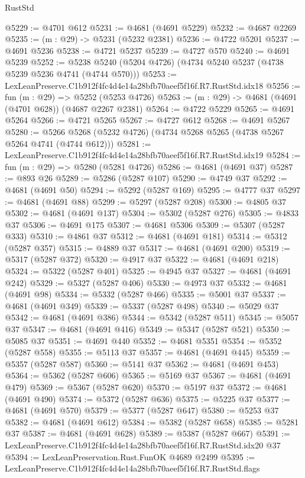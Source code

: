 \begin{lexlean}{RustStd}
\begin{coremodule}
@5229 := @4701 @612
@5231 := @4681 (@4691 @5229)
@5232 := @4687 @2269
@5235 := (m : @29) -> @5231 (@5232 @2381)
@5236 := @4722 @5201
@5237 := @4691 @5236
@5238 := @4721 @5237
@5239 := @4727 @570
@5240 := @4691 @5239
@5252 := @5238 @5240 (@5204 @4726) (@4734 @5240 @5237 (@4738 @5239 @5236 @4741 (@4744 @570)))
@5253 := LexLeanPreserve.C1b912f4fc4d4e14a28bfb70aeef5f16f.R7.RustStd.idx18
@5256 := fun (m : @29) => @5252 (@5253 @4726)
@5263 := (m : @29) -> @4681 (@4691 (@4701 @628)) (@4687 @2267 @2381)
@5264 := @4722 @5229
@5265 := @4691 @5264
@5266 := @4721 @5265
@5267 := @4727 @612
@5268 := @4691 @5267
@5280 := @5266 @5268 (@5232 @4726) (@4734 @5268 @5265 (@4738 @5267 @5264 @4741 (@4744 @612)))
@5281 := LexLeanPreserve.C1b912f4fc4d4e14a28bfb70aeef5f16f.R7.RustStd.idx19
@5284 := fun (m : @29) => @5280 (@5281 @4726)
@5286 := @4681 (@4691 @37)
@5287 := @893 @26
@5289 := @5286 (@5287 @107)
@5290 := @4749 @37
@5292 := @4681 (@4691 @50)
@5294 := @5292 (@5287 @169)
@5295 := @4777 @37
@5297 := @4681 (@4691 @88)
@5299 := @5297 (@5287 @208)
@5300 := @4805 @37
@5302 := @4681 (@4691 @137)
@5304 := @5302 (@5287 @276)
@5305 := @4833 @37
@5306 := @4691 @175
@5307 := @4681 @5306
@5309 := @5307 (@5287 @333)
@5310 := @4861 @37
@5312 := @4681 (@4691 @181)
@5314 := @5312 (@5287 @357)
@5315 := @4889 @37
@5317 := @4681 (@4691 @200)
@5319 := @5317 (@5287 @372)
@5320 := @4917 @37
@5322 := @4681 (@4691 @218)
@5324 := @5322 (@5287 @401)
@5325 := @4945 @37
@5327 := @4681 (@4691 @242)
@5329 := @5327 (@5287 @406)
@5330 := @4973 @37
@5332 := @4681 (@4691 @98)
@5334 := @5332 (@5287 @466)
@5335 := @5001 @37
@5337 := @4681 (@4691 @349)
@5339 := @5337 (@5287 @498)
@5340 := @5029 @37
@5342 := @4681 (@4691 @386)
@5344 := @5342 (@5287 @511)
@5345 := @5057 @37
@5347 := @4681 (@4691 @416)
@5349 := @5347 (@5287 @521)
@5350 := @5085 @37
@5351 := @4691 @440
@5352 := @4681 @5351
@5354 := @5352 (@5287 @558)
@5355 := @5113 @37
@5357 := @4681 (@4691 @445)
@5359 := @5357 (@5287 @587)
@5360 := @5141 @37
@5362 := @4681 (@4691 @453)
@5364 := @5362 (@5287 @606)
@5365 := @5169 @37
@5367 := @4681 (@4691 @479)
@5369 := @5367 (@5287 @620)
@5370 := @5197 @37
@5372 := @4681 (@4691 @490)
@5374 := @5372 (@5287 @636)
@5375 := @5225 @37
@5377 := @4681 (@4691 @570)
@5379 := @5377 (@5287 @647)
@5380 := @5253 @37
@5382 := @4681 (@4691 @612)
@5384 := @5382 (@5287 @658)
@5385 := @5281 @37
@5387 := @4681 (@4691 @628)
@5389 := @5387 (@5287 @667)
@5391 := LexLeanPreserve.C1b912f4fc4d4e14a28bfb70aeef5f16f.R7.RustStd.idx20 @37
@5394 := LexLeanPreservation.Rust.FunOK @4689 @2499
@5395 := LexLeanPreserve.C1b912f4fc4d4e14a28bfb70aeef5f16f.R7.RustStd.flags

\end{coremodule}
\end{lexlean}
